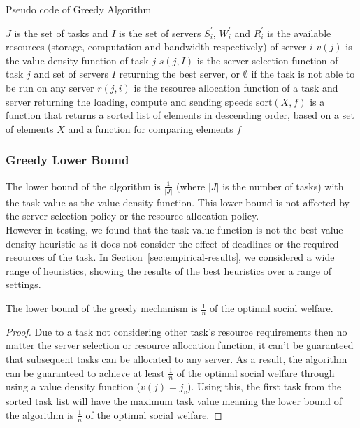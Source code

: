 \begin{algorithm}
    \caption{Pseudo code of Greedy Algorithm}
    \label{alg:greedy-mechanism}
    \begin{algorithmic}
        \REQUIRE $J$ is the set of tasks and $I$ is the set of servers
        \REQUIRE $S^{'}_i$, $W^{'}_i$ and $R^{'}_i$ is the available resources
            (storage, computation and bandwidth respectively) of server $i$
        \REQUIRE $v(j)$ is the value density function of task $j$
        \REQUIRE $s(j, I)$ is the server selection function of task $j$ and set of servers $I$ returning the best
            server, or $\emptyset$ if the task is not able to be run on any server
        \REQUIRE $r(j, i)$ is the resource allocation function of a task and server returning the
            loading, compute and sending speeds
        \REQUIRE $\text{sort}(X, f)$ is a function that returns a sorted list of elements in descending order, based
            on a set of elements $X$ and a function for comparing elements $f$

            \ENDIF
        \ENDFOR
    \end{algorithmic}
\end{algorithm}

\subsubsection{Greedy Lower Bound}
\label{subsubsec:greedy-lower-bound}
The lower bound of the algorithm is $\frac{1}{\left|J\right|}$ (where $\left|J\right|$ is the number of tasks) with
the task value as the value density function. This lower bound is not affected by the server selection policy or the
resource allocation policy. \\
However in testing, we found that the task value function is not the best value density heuristic as it does not
consider the effect of deadlines or the required resources of the task. In Section~\ref{sec:empirical-results}, we
considered a wide range of heuristics, showing the results of the best heuristics over a range of settings.

\begin{theorem}
    The lower bound of the greedy mechanism is $\frac{1}{n}$ of the optimal social welfare.
\end{theorem}
\begin{proof}
    Due to a task not considering other task's resource requirements then no matter the server selection or resource
    allocation function, it can't be guaranteed that subsequent tasks can be allocated to any server. As a result,
    the algorithm can be guaranteed to achieve at least $\frac{1}{n}$ of the optimal social welfare through using a
    value density function ($v(j) = j_v$). Using this, the first task from the sorted task list will have the maximum task
    value meaning the lower bound of the algorithm is $\frac{1}{n}$ of the optimal social welfare.
\end{proof}

